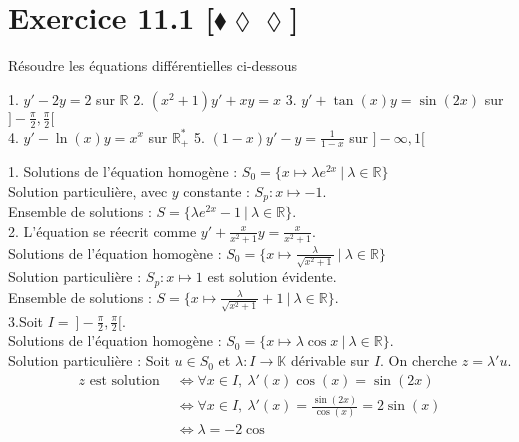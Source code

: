 \documentclass[10pt]{article}
\begin{document}
\section*{Exercice 11.1 [$\blacklozenge\lozenge\lozenge$]}
\begin{tcolorbox}[enhanced, width=7in, center, size=fbox, fontupper=\large, drop shadow southwest]
    Résoudre les équations différentielles ci-dessous
    \begin{center}
        1. $y' - 2y = 2$ sur $\mathbb{R}$ \hspace{0.5cm} 2. $(x^2+1)y'+xy=x$ \hspace{0.5cm} 3. $y' + \tan(x)y = \sin(2x)$ sur $]-\frac{\pi}{2}, \frac{\pi}{2}[$\\
        4. $y'-\ln(x)y = x^x$ sur $\mathbb{R}_+^*$ \hspace{1cm} 5. $(1-x)y' - y = \frac{1}{1-x}$ sur $]-\infty, 1[$
    \end{center}
    1. Solutions de l'équation homogène : $S_0=\{x\mapsto\lambda e^{2x} ~ | ~ \lambda\in\mathbb{R}\}$\\
    Solution particulière, avec $y$ constante : $S_p : x\mapsto -1$.\\
    Ensemble de solutions : $S = \{\lambda e^{2x} - 1 ~ | ~ \lambda\in\mathbb{R}\}$.\\[0.2cm]
    2. L'équation se réecrit comme $y' + \frac{x}{x^2+1}y=\frac{x}{x^2+1}$.\\
    Solutions de l'équation homogène : $S_0 = \{x\mapsto\frac{\lambda}{\sqrt{x^2+1}} ~ | ~ \lambda \in \mathbb{R}\}$\\
    Solution particulière : $S_p:x\mapsto1$ est solution évidente.\\
    Ensemble de solutions : $S = \{x\mapsto\frac{\lambda}{\sqrt{x^2+1}}+1 ~ | ~ \lambda\in\mathbb{R}\}$.\\[0.2cm]
    3.Soit $I = ~ ]-\frac{\pi}{2}, \frac{\pi}{2}[$.\\
    Solutions de l'équation homogène : $S_0 = \{x\mapsto \lambda \cos x ~ | ~ \lambda \in \mathbb{R}\}$.\\
    Solution particulière : Soit $u\in S_0$ et $\lambda:I\rightarrow\mathbb{K}$ dérivable sur $I$. On cherche $z=\lambda'u$.
    \begin{align*}
        z \text{ est solution } &\iff \forall{x\in I}, ~ \lambda'(x)\cos(x) = \sin(2x)\\
        &\iff \forall{x}\in I, ~ \lambda'(x) = \frac{\sin(2x)}{\cos(x)}=2\sin(x)\\
        &\iff \lambda =-2\cos

\end{align*}
\end{tcolorbox}
\end{document}
